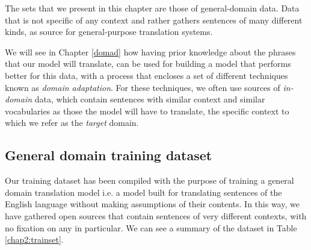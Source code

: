 \documentclass[11pt,english,listoffigures,listoftables]{tfgetsinf}
\begin{document}
The sets that we present in this chapter are those of general-domain data. Data that is not specific of any context and rather gathers sentences of many different kinds, as source for general-purpose translation systems. 

We will see in Chapter \ref{domad} how having prior knowledge about the phrases that our model will translate, can be used for building a model that performs better for this data, with a process that encloses a set of different techniques known as \textit{domain adaptation}. For these techniques, we often use sources of \textit{in-domain} data, which contain sentences with similar context and similar vocabularies as those the model will have to translate, the specific context to which we refer as the \textit{target} domain.


\subsection{General domain training dataset}\label{dataset}
Our training dataset has been compiled with the purpose of training a general domain translation model i.e. a model built for translating sentences of the English language without making assumptions of their contents. In this way, we have gathered open sources that contain sentences of very different contexts, with no fixation on any in particular. We can see a summary of the dataset in Table \ref{chap2:trainset}. 

\end{document}
